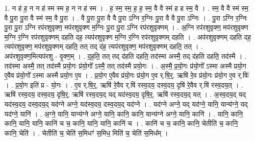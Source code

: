\documentclass[17pt]{extarticle}
\begin{document}
1. न ह॑ ह॒ न न ह॑ स्म स्म ह॒ न न ह॑ स्म । . ह॒ स्म॒ स्म॒ ह॒ ह॒ स्म॒ वै वै स्म॑ ह ह स्म॒ वै । . स्म॒ वै वै स्म॑ स्म॒ वै पु॒रा पु॒रा वै स्म॑ स्म॒ वै पु॒रा । . वै पु॒रा पु॒रा वै वै पु॒रा ऽग्नि र॒ग्निः पु॒रा वै वै पु॒रा ऽग्निः । . पु॒रा ऽग्नि र॒ग्निः पु॒रा पु॒रा ऽग्नि रप॑रशुवृक्ण॒ मप॑रशुवृक्ण म॒ग्निः पु॒रा पु॒रा ऽग्नि रप॑रशुवृक्णम् । . अ॒ग्नि रप॑रशुवृक्ण॒ मप॑रशुवृक्ण म॒ग्नि र॒ग्नि रप॑रशुवृक्णम् दहति दह॒ त्यप॑रशुवृक्ण म॒ग्नि र॒ग्नि रप॑रशुवृक्णम् दहति । . अप॑रशुवृक्णम् दहति दह॒ त्यप॑रशुवृक्ण॒ मप॑रशुवृक्णम् दहति॒ तत् तद् द॑ह॒ त्यप॑रशुवृक्ण॒ मप॑रशुवृक्णम् दहति॒ तत् । . अप॑रशुवृक्ण॒मित्यप॑रशु - वृ॒क्ण॒म् । . द॒ह॒ति॒ तत् तद् द॑हति दहति॒ तद॑स्मा अस्मै॒ तद् द॑हति दहति॒ तद॑स्मै । . तद॑स्मा अस्मै॒ तत् तद॑स्मै प्रयो॒गः प्र॑यो॒गो᳚ ऽस्मै॒ तत् तद॑स्मै प्रयो॒गः । . अ॒स्मै॒ प्र॒यो॒गः प्र॑यो॒गो᳚ ऽस्मा अस्मै प्रयो॒ग ए॒वैव प्र॑यो॒गो᳚ ऽस्मा अस्मै प्रयो॒ग ए॒व । . प्र॒यो॒ग ए॒वैव प्र॑यो॒गः प्र॑यो॒ग ए॒व र्.षि॒र्॒. ऋषि॑ रे॒व प्र॑यो॒गः प्र॑यो॒ग ए॒व र्.षिः॑ । . प्र॒यो॒ग इति॑ प्र - यो॒गः । . ए॒व र्.षि॒र्॒. ऋषि॑ रे॒वैव र्.षि॑ रस्व॒दय॒ दस्व॒दय॒ दृषि॑ रे॒वैव र्.षि॑ रस्व॒दय॒त् । . ऋषि॑ रस्व॒दय॒ दस्व॒दय॒ दृषि॒र्॒. ऋषि॑ रस्व॒दय॒द् यद् यद॑स्व॒दय॒ दृषि॒र्॒. ऋषि॑ रस्व॒दय॒द् यत् । . अ॒स्व॒दय॒द् यद् यद॑स्व॒दय॒ दस्व॒दय॒द् यद॑ग्ने अग्ने॒ यद॑स्व॒दय॒ दस्व॒दय॒द् यद॑ग्ने । . यद॑ग्ने अग्ने॒ यद् यद॑ग्ने॒ यानि॒ यान्य॑ग्ने॒ यद् यद॑ग्ने॒ यानि॑ । . अ॒ग्ने॒ यानि॒ यान्य॑ग्ने अग्ने॒ यानि॒ कानि॒ कानि॒ यान्य॑ग्ने अग्ने॒ यानि॒ कानि॑ । . यानि॒ कानि॒ कानि॒ यानि॒ यानि॒ कानि॑ च च॒ कानि॒ यानि॒ यानि॒ कानि॑ च । . कानि॑ च च॒ कानि॒ कानि॒ चेतीति॑ च॒ कानि॒ कानि॒ चेति॑ । . चेतीति॑ च॒ चेति॑ स॒मिधꣳ॑ स॒मिध॒ मिति॑ च॒ चेति॑ स॒मिध᳚म् । \newline
\end{document}
